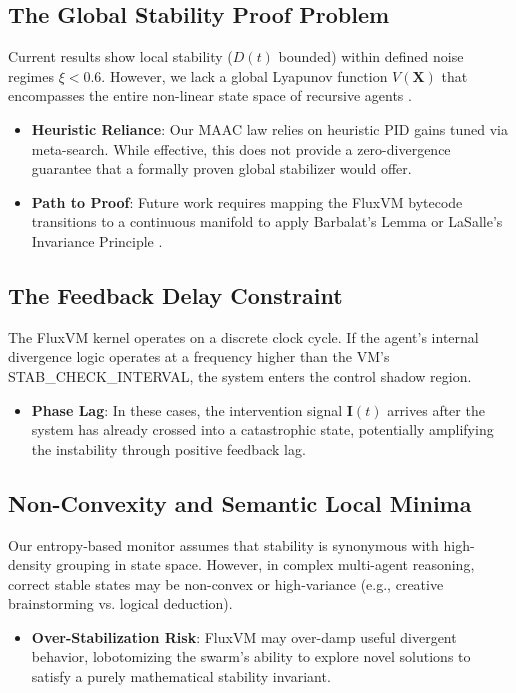 \documentclass{article}
\begin{document}
\subsection{The Global Stability Proof Problem}
Current results show local stability ($D(t)$ bounded) within defined noise regimes $\xi < 0.6$. However, we lack a global Lyapunov function $V(\mathbf{X})$ that encompasses the entire non-linear state space of recursive agents \cite{khalil2002nonlinear}. 
\begin{itemize}
    \item \textbf{Heuristic Reliance}: Our MAAC law relies on heuristic PID gains tuned via meta-search. While effective, this does not provide a zero-divergence guarantee that a formally proven global stabilizer would offer.
    \item \textbf{Path to Proof}: Future work requires mapping the FluxVM bytecode transitions to a continuous manifold to apply Barbalat's Lemma or LaSalle's Invariance Principle \cite{lasalle1960some}.
\end{itemize}

\subsection{The Feedback Delay Constraint}
The FluxVM kernel operates on a discrete clock cycle. If the agent's internal divergence logic operates at a frequency higher than the VM's STAB\_CHECK\_INTERVAL, the system enters the control shadow region.
\begin{itemize}
    \item \textbf{Phase Lag}: In these cases, the intervention signal $\mathbf{I}(t)$ arrives after the system has already crossed into a catastrophic state, potentially amplifying the instability through positive feedback lag.
\end{itemize}

\subsection{Non-Convexity and Semantic Local Minima}
Our entropy-based monitor assumes that stability is synonymous with high-density grouping in state space. However, in complex multi-agent reasoning, correct stable states may be non-convex or high-variance (e.g., creative brainstorming vs. logical deduction).
\begin{itemize}
    \item \textbf{Over-Stabilization Risk}: FluxVM may over-damp useful divergent behavior, lobotomizing the swarm's ability to explore novel solutions to satisfy a purely mathematical stability invariant.
\end{itemize}
\end{document}
